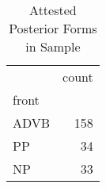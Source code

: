 \begin{table}[htbp!]
\centering
\caption{Attested Posterior Forms in Sample}
\label{table:post_phtype}
\begin{tabular}{lr}
\toprule
{} &  count \\
front &        \\
\midrule
ADVB  &    158 \\
PP    &     34 \\
NP    &     33 \\
\bottomrule
\end{tabular}
\end{table}
